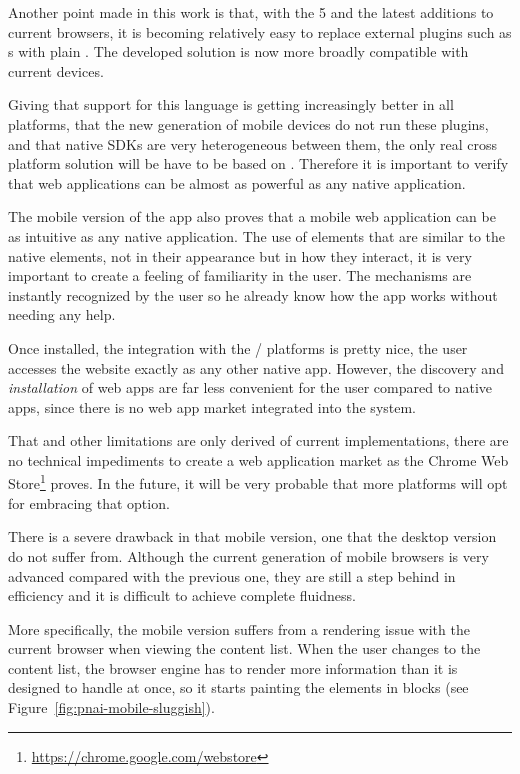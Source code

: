 Another point made in this work is that, with the 5 and the latest additions to current browsers, it is becoming relatively easy to replace external plugins such as s with plain .
The developed solution is now more broadly compatible with current devices.

Giving that support for this language is getting increasingly better in all platforms, that the new generation of mobile devices do not run these plugins, and that native SDKs are very heterogeneous between them, the only real cross platform solution will be have to be based on .
Therefore it is important to verify that web applications can be almost as powerful as any native application.

The mobile version of the app also proves that a mobile web application can be as intuitive as any native application.
The use of elements that are similar to the native elements, not in their appearance but in how they interact, it is very important to create a feeling of familiarity in the user.
The  mechanisms are instantly recognized by the user so he already know how the app works without needing any help.

Once installed, the integration with the / platforms is pretty nice, the user accesses the website exactly as any other native app.
However, the discovery and \emph{installation} of web apps are far less convenient for the user compared to native apps, since there is no web app market integrated into the system.

That and other limitations are only derived of current implementations, there are no technical impediments to create a web application market as the Chrome Web Store\footnote{\url{https://chrome.google.com/webstore}} proves.
In the future, it will be very probable that more platforms will opt for embracing that option.

There is a severe drawback in that mobile version, one that the desktop version do not suffer from.
Although the current generation of mobile browsers is very advanced compared with the previous one, they are still a step behind in efficiency and it is difficult to achieve complete fluidness.

More specifically, the mobile version suffers from a rendering issue with the current  browser when viewing the content list.
When the user changes to the content list, the browser engine has to render more information than it is designed to handle at once, so it starts painting the elements in blocks (see Figure~\vref{fig:pnai-mobile-sluggish}).

